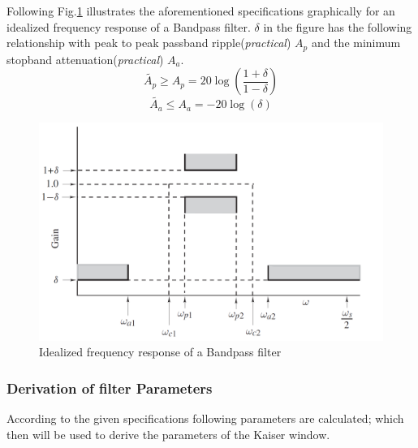 \documentclass[a4paper,11pt]{article}%
\begin{document}
Following Fig.\ref{idealbpfilter} illustrates the aforementioned specifications graphically for an idealized frequency response of a Bandpass filter. $\delta$ in the figure has the following relationship with peak to peak passband ripple(\textit{practical}) $A_p$ and the minimum stopband attenuation(\textit{practical}) $A_a$.\\

\begin{equation}
	\tilde{A_p} \ge A_p = 20\log(\frac{1+\delta}{1-\delta})
	\label{A_p}
\end{equation}
\begin{equation}
 \tilde{A_a} \le A_a = -20\log(\delta)
 \label{A_a}
\end{equation}

\begin{figure}[!h]
	\centering
	\includegraphics[scale=0.4]{figures/filtersepecs}
	\caption{Idealized frequency response of a Bandpass filter\cite{antonio}}
	\label{idealbpfilter}
\end{figure}

\subsubsection{Derivation of filter Parameters}

According to the given specifications following parameters are calculated; which then will be used to derive the parameters of the Kaiser window.  
\end{document}
